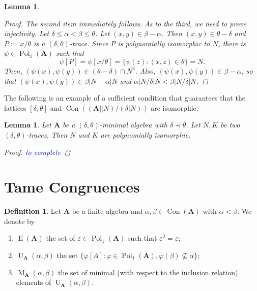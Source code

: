 \documentclass{amsart}
\theoremstyle{plain}
\newtheorem{lemma}[theorem]{Lemma}
\theoremstyle{definition}
\newtheorem{definition}[theorem]{Definition}
\theoremstyle{remark}
\def\phi{\varphi}
\def\epsilon{\varepsilon}
\DeclareMathOperator{\Con}{Con}
\DeclareMathOperator{\Pol}{Pol}
\DeclareMathOperator{\Id}{E}
\DeclareMathOperator{\U}{U}
\DeclareMathOperator{\M}{M}
\begin{document}
\begin{lemma}
\begin{proof}
        The second item immediately follows. As to the third, we need to prove injectivity. 
        Let $\delta \le \alpha < \beta \le \theta$. 
        Let $(x,y) \in \beta - \alpha$. 
        Then $(x,y) \in \theta - \delta$ and $P:=x/\theta$ is a $(\delta, \theta)$-trace. 
        Since $P$ is polynomially isomorphic to $N$, there is $\psi \in \Pol_1(\mathbf{A})$ such that 
        \begin{equation*}
            \psi[P] = \psi[x/\theta] =\{\psi(z): (x,z) \in \theta\}= N \text{.}
        \end{equation*}
        Then, $(\psi(x),\psi(y)) \in (\theta - \delta) \cap N^2$.
        Also, $(\psi(x),\psi(y)) \in \beta - \alpha$, so that $(\psi(x),\psi(y)) \in \beta|N - \alpha|N$ and $\alpha|N/\delta|N < \beta|N/\delta|N$. 
    \end{proof}
\end{lemma}

The following is an example of a sufficient condition that guarantees that the lattices $[\delta, \theta]$ and $\Con((\mathbf{A}||N)/(\delta|N))$ are isomorphic. 

\begin{lemma}
    Let $\mathbf{A}$ be a $(\delta, \theta)$-minimal algebra with $\delta \prec \theta$. 
    Let $N,K$ be two $(\delta, \theta)$-traces. 
    Then $N$ and $K$ are polynomially isomorphic. 
    \begin{proof}
        \textcolor{blue}{to complete}
    \end{proof}
\end{lemma}

\section{Tame Congruences}

\begin{definition}
    Let $\mathbf{A}$ be a finite algebra and $\alpha, \beta \in \Con(\mathbf{A})$ with $\alpha < \beta$. 
    We denote by
    \begin{enumerate}
        \item $\Id(\mathbf{A})$ the set of $ \epsilon \in \Pol_1(\mathbf{A})$ such that $\epsilon^2 = \epsilon$; 
        \item $\U_{\mathbf{A}}(\alpha, \beta)$ the set $\{\phi[A] : \phi \in \Pol_1(\mathbf{A}), \phi(\beta) \nsubseteq \alpha\}$; 
        \item $\M_{\mathbf{A}}(\alpha, \beta)$ the set of minimal (with respect to the inclusion relation) elements of $\U_{\mathbf{A}}(\alpha, \beta)$. 
    \end{enumerate}
\end{definition}
\end{document}
